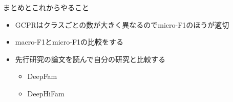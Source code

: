 \documentclass[leno,xcolor=dvipsnames]{beamer}
\begin{document}
  \begin{frame}{まとめとこれからやること}
    \begin{itemize} 
      \item GCPRはクラスごとの数が大きく異なるのでmicro-F1のほうが適切
      \item macro-F1とmicro-F1の比較をする
      \item 先行研究の論文を読んで自分の研究と比較する
      \begin{itemize}
        \item DeepFam
        \item DeepHiFam
      \end{itemize}
    \end{itemize}
  \end{frame}
\end{document}
